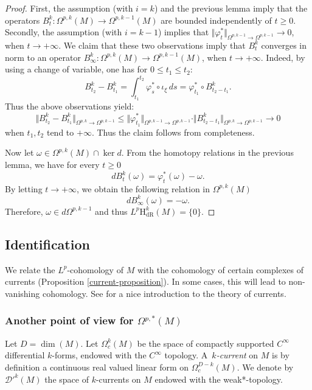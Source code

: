 \documentclass[JEP,XML,SOM,Unicode,published]{cedram}
\newcommand{\dR}{\mathrm{dR}}
\newcommand{\rH}{\mathrm{H}}
\theoremstyle{plain}
\theoremstyle{remark}
\theoremstyle{definition}
\begin{document}
\begin{proof} First, the assumption (with $i=k$) and the previous lemma imply that the operators
$B_t^k: \Omega^{p,k}(M) \to \Omega^{p, k-1}(M)$
are bounded independently of $t \geqslant 0$.
Secondly, the assumption (with $i = k-1$) implies that $\Vert \varphi_t^* \Vert_{\Omega^{p,k-1} \to \Omega^{p,k-1}} \to 0$, when $t \to +\infty$.
We claim that these two observations imply that $B_t^k$ converges in norm to an operator
$B_\infty^k: \Omega^{p,k}(M) \to \Omega^{p, k-1}(M)$, when $t \to +\infty$.
Indeed, by using a change of variable, one has for $0 \leqslant t_1 \leqslant t_2$:
\[B_{t_2}^k - B_{t_1}^k = \int_{t_1}^{t_2} \varphi_s^* \circ \iota_\xi \,ds = \varphi_{t_1}^* \circ B_{t_2 - t_1}^k.\]
Thus the above observations yield:
\[ \Vert B_{t_2}^k - B_{t_1}^k \Vert_{\Omega^{p,k} \to \Omega^{p, k-1}}
\leqslant \Vert \varphi_{t_1}^* \Vert_{\Omega^{p,k-1} \to \Omega^{p,k-1}} \cdot \Vert B_{t_2- t_1}^k \Vert_{\Omega^{p,k} \to \Omega^{p, k-1}} \to 0\]
when $t_1, t_2$ tend to $+\infty$. Thus the claim follows from completeness.

Now let $\omega \in \Omega^{p, k}(M) \cap \ker d$. From the homotopy relations in the previous lemma, we have for every $t \geqslant 0$
\[d B_t^k (\omega) = \varphi_t^* (\omega) - \omega .\]
By letting $t \to +\infty$, we obtain the following relation in $\Omega^{p, k}(M)$
\[ d B_\infty^k (\omega) = - \omega.\]
Therefore, $\omega \in d\Omega^{p,k-1}$ and thus $L^p \rH_\dR^k (M) = \{0\}$.
\end{proof}

\subsection{Identification}

We relate the $L^p$\nobreakdash-cohomology of $M$ with the cohomology of certain complexes of currents (Proposition \ref{current-proposition}).
In some cases, this will lead to non-vanishing
cohomology. See \cite{DS} for a nice introduction to the theory of currents.

\subsubsection*{Another point of view for $\Omega^{p, *}(M)$}
Let $D = \dim(M)$. Let $\Omega_c^k (M)$ be the space of compactly supported $C^\infty$ differential $k$-forms, endowed with the $C^\infty$ topology. A~\emph{$k$\nobreakdash-current}
on $M$ is by definition a continuous real valued linear form on $\Omega_c^{D-k} (M)$. We denote by $\mathcal D '^k(M)$ the space of $k$-currents on $M$ endowed with the weak*-topology.
\end{document}
